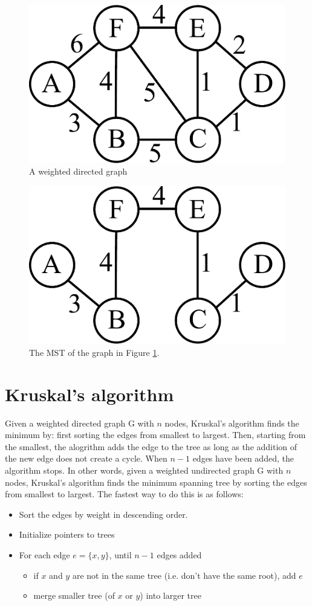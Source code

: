 \begin{figure}[H]
\includegraphics[width = .4\textwidth]{graph4.pdf}
\caption{A weighted directed graph}
\label{mst:graph4}
\end{figure}

\begin{figure}[H]
\includegraphics[width = .4\textwidth]{graph5.pdf}
\caption{The MST of the graph in Figure \ref{mst:graph4}.}
\end{figure}

\section*{Kruskal's algorithm}

Given a weighted directed graph G with $n$ nodes, Kruskal's algorithm finds the minimum by: first sorting the edges from smallest to largest.
Then, starting from the smallest, the alogrithm adds the edge to the tree as long as the addition of the new edge does not create a cycle.
When $n-1$ edges have been added, the algorithm stops.
In other words, given a weighted undirected graph G with $n$ nodes, Kruskal's algorithm finds the minimum spanning tree by sorting the edges from smallest to largest.
The fastest way to do this is as follows:

\begin{itemize}


\item Sort the edges by weight in descending order.

\item Initialize pointers to trees

\item For each edge $e=\{x, y\}$, until $n-1$ edges added  

\begin{itemize}

\item if $x$ and $y$ are not in the same tree (i.e. don’t have the same root), add $e$

\item merge smaller tree (of $x$ or $y$) into larger tree 

\end{itemize}

\end{itemize}

